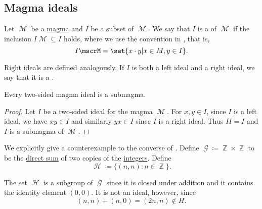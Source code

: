 \subsection{Magma ideals}\label{sec:magma_ideals}

\begin{definition}\label{def:magma_ideal}
  Let \( \mscrM \) be a \hyperref[def:magma]{magma} and \( I \) be a subset of \( \mscrM \). We say that \( I \) is a  of \( \mscrM \) if the inclusion \( I\mscrM \subseteq I \) holds, where we use the convention in , that is,
  \begin{equation*}
    I \mscrM = \set{ x \cdot y | x \in M, y \in I }.
  \end{equation*}

  Right ideals are defined analogously. If \( I \) is both a left ideal and a right ideal, we say that it is a .
\end{definition}

\begin{proposition}\label{thm:magma_ideal_is_submagma}
  Every two-sided magma ideal is a submagma.
\end{proposition}
\begin{proof}
  Let \( I \) be a two-sided ideal for the magma \( \mscrM \). For \( x, y \in I \), since \( I \) is a left ideal, we have \( xy \in I \) and similarly \( yx \in I \) since \( I \) is a right ideal. Thus \( II = I \) and \( I \) is a submagma of \( \mscrM \).
\end{proof}

\begin{example}\label{ex:subgroup_is_not_ideal}
  We explicitly give a counterexample to the converse of . Define \( \mscrG \coloneqq \BbbZ \times \BbbZ \) to be the \hyperref[def:group_direct_sum]{direct sum} of two copies of the \hyperref[def:integers]{integers}. Define
  \begin{equation*}
    \mscrH \coloneqq \{ (n, n) \colon n \in \BbbZ \}.
  \end{equation*}

  The set \( \mscrH \) is a subgroup of \( \mscrG \) since it is closed under addition and it contains the identity element \( (0, 0) \). It is not an ideal, however, since
  \begin{equation*}
    (n, n) + (n, 0) = (2n, n) \not\in H.
  \end{equation*}
\end{example}


